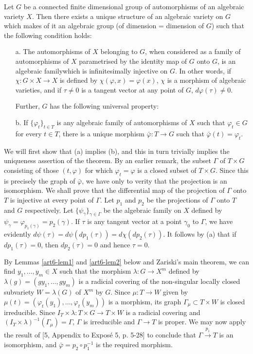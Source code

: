 \begin{theorem*}
Let $G$ be a connected finite dimensional group of automorphisms of an algebraic variety $X$. Then there exists a unique structure of an algebraic variety on $G$ which makes of it an algebraic group (of dimension = dimension of $G$) such that the following condition holds:
\begin{itemize}
\item[a.] The automorphisms of $X$ belonging to $G$, when considered as a family of automorphisms of $X$ parametrised by the identity map of $G$ onto $G$, is an algebraic family\pageoriginale which is infinitesimally injective on $G$. In other words, if $\chi: G \times X \to X$ is defined by $\chi (\varphi, x) = \varphi (x)$, $\chi$ is a morphism of algebraic varieties, and if $\tau \neq 0$ is a tangent vector at any point of $G$, $d \varphi (\tau) \neq 0$.

Further, $G$ has the following universal property:

\item[b.] If $\{\varphi_t\}_{t \in T}$ is any algebraic family of automorphisms of $X$ such that  $\varphi_t \in G$ for every $t \in T$, there is a unique morphism $\bar{\varphi}: T \to G$ such that $\bar{\varphi} (t) = \varphi_t$.
\end{itemize}
\end{theorem*}

We will first show that (a) implies (b), and this in turn trivially implies the uniqueness assertion of the theorem. By an earlier remark, the subset $\Gamma$ of $T \times G$ consisting of those $(t, \varphi)$ for which $\varphi_t = \varphi$ is a closed subset of $T \times G$. Since this is precisely the graph of $\bar{\varphi}$, we have only to verity that the projection is an isomorphism. We shall prove that the differential map of the projection of $\Gamma$ onto $T$ is injective at every point of $\Gamma$. Let $p_1$ and $p_2$ be the projections of $\Gamma$ onto $T$ and $G$ respectively. Let $\{\psi_\gamma\}_{\gamma \in \Gamma}$ be the algebraic family on $X$ defined by $\psi_\gamma = \varphi_{p_1 (\gamma)} = p_2 (\gamma)$. If $\tau$ is any tangent vector at a point $\gamma_0$ to $\Gamma$, we have evidently $d \psi (\tau) = d \psi (d p_1 (\tau)) = d \chi (d p_2 (\tau))$. It follows by (a) that if $d p_1 (\tau) =0$, then $dp_2 (\tau) = 0$ and hence $\tau= 0$.

By Lemmas \ref{art6-lem1} and \ref{art6-lem2} below and Zariski's main theorem, we can find $y_1, \ldots, y_m \in X$ such that the morphism $\lambda: G \to X^m$ defined by $\lambda (g) = (g y_1, \ldots, g y_m)$ is a radicial covering of the non-singular locally closed subvariety $W = \lambda (G)$ of $X^m$ by $G$. Since $\mu: T \to W$ given by $\mu(t) = (\varphi_t (y_1), \ldots, \varphi_t (y_m))$ is a morphism, its graph $\Gamma_\mu \subset T \times W$ is closed irreducible. Since $I_T \times \lambda : T \times G \to T \times W$ is a radicial covering and $(I_T \times \lambda)^{-1} (\Gamma_\mu) = \Gamma$, $\Gamma$ is irreducible and $\Gamma \to T$ is proper. We may now apply the result of [5, Appendix to Expos\'e 5, p. 5-28] to conclude that $\Gamma \xrightarrow{p_1} T$ is an isomorphism, and $\bar{\varphi} = p_2 \circ p^{-1}_1$ is the required morphism.

